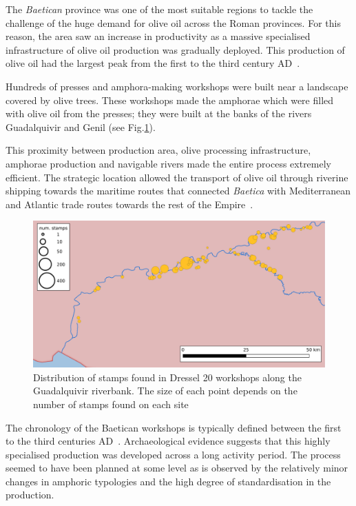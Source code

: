 The \textit{Baetican} province was one of the most suitable regions to tackle the challenge of the huge demand for olive oil across the Roman provinces. For this reason, the area saw an increase in productivity as a massive specialised infrastructure of olive oil production was gradually deployed. This production of olive oil had the largest peak from the first to the third century AD~\citep{remesal_concierto}. 

Hundreds of presses and amphora-making workshops were built near a landscape covered by olive trees. These workshops made the amphorae which were filled with olive oil from the presses; they were built at the banks of the rivers Guadalquivir and Genil (see Fig.\ref{workshop}).

This proximity between production area, olive processing infrastructure, amphorae production and navigable rivers made the entire process extremely efficient. The strategic location allowed the transport of olive oil through riverine shipping towards the maritime routes that connected \textit{Baetica} with Mediterranean and Atlantic trade routes towards the rest of the Empire~\citep{garcia_vargas_enrique_formal_2010}.

\begin{figure}[htp]
	\centering
\includegraphics[width=\linewidth]{baetica}
\caption{Distribution of stamps found in Dressel 20 workshops along the Guadalquivir riverbank. The size of each point depends on the number of stamps found on each site}

\label{workshop}
\end{figure} 

The chronology of the Baetican workshops is typically defined between the first to the third centuries AD~\citep{millet_anforas_1998,rodriguez_baetican_1998,chic2005comercio}. Archaeological evidence suggests that this highly specialised production was developed across a long activity period\citep{remesal_anforas_2004}. The process seemed to have been planned at some level as is observed by the relatively minor changes in amphoric typologies and the high degree of standardisation in the production. 

